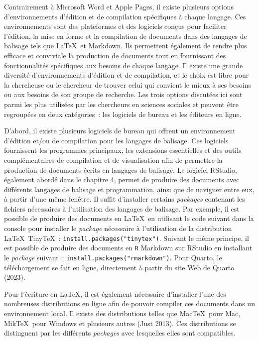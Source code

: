 \documentclass[
  letterpaper,
]{scrbook}
\begin{document}
Contrairement à Microsoft Word et Apple Pages, il existe plusieurs
options d'environnements d'édition et de compilation spécifiques à
chaque langage. Ces environnements sont des plateformes et des logiciels
conçus pour faciliter l'édition, la mise en forme et la compilation de
documents dans des langages de balisage tels que \LaTeX~et Markdown. Ils
permettent également de rendre plus efficace et conviviale la production
de documents tout en fournissant des fonctionnalités spécifiques aux
besoins de chaque langage. Il existe une grande diversité
d'environnements d'édition et de compilation, et le choix est libre pour
la chercheuse ou le chercheur de trouver celui qui convient le mieux à
ses besoins ou aux besoins de son groupe de recherche. Les trois options
discutées ici sont parmi les plus utilisées par les chercheurs en
sciences sociales et peuvent être regroupées en deux catégories~: les
logiciels de bureau et les éditeurs en ligne.

D'abord, il existe plusieurs logiciels de bureau qui offrent un
environnement d'édition et/ou de compilation pour les langages de
balisage. Ces logiciels fournissent les programmes principaux, les
extensions essentielles et des outils complémentaires de compilation et
de visualisation afin de permettre la production de documents écrits en
langages de balisage. Le logiciel RStudio, également abordé dans le
chapitre 4, permet de produire des documents avec différents langages de
balisage et programmation, ainsi que de naviguer entre eux, à partir
d'une même fenêtre. Il suffit d'installer certains \emph{packages}
contenant les fichiers nécessaires à l'utilisation des langages de
balisage. Par exemple, il est possible de produire des documents en
\LaTeX~en utilisant le code suivant dans la console pour installer le
\emph{package} nécessaire à l'utilisation de la distribution
\LaTeX~Tiny\TeX~: \texttt{install.packages("tinytex")}. Suivant le même
principe, il est possible de produire des documents en \texttt{R}
Markdown sur RStudio en installant le \emph{package} suivant~:
\texttt{install.packages("rmarkdown")}. Pour Quarto, le téléchargement
se fait en ligne, directement à partir du site Web de Quarto (2023).

Pour l'écriture en \LaTeX, il est également nécessaire d'installer l'une
des nombreuses distributions en ligne afin de pouvoir compiler ces
documents dans un environnement local. Il existe des distributions
telles que Mac\TeX~pour Mac, Mik\TeX~pour Windows et plusieurs autres
(Just 2013). Ces distributions se distinguent par les différents
\emph{packages} avec lesquelles elles sont compatibles.
\end{document}
